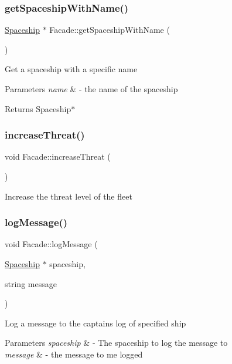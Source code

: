 \subsubsection{\texorpdfstring{get\+Spaceship\+With\+Name()}{getSpaceshipWithName()}}
{\footnotesize\ttfamily \hyperlink{classSpaceship}{Spaceship} $\ast$ Facade\+::get\+Spaceship\+With\+Name (\begin{DoxyParamCaption}{ }\end{DoxyParamCaption})}

Get a spaceship with a specific name 
\begin{DoxyParams}{Parameters}
{\em name} & -\/ the name of the spaceship \\
\hline
\end{DoxyParams}
\begin{DoxyReturn}{Returns}
Spaceship$\ast$ 
\end{DoxyReturn}
\mbox{\label{classFacade_ab7da0040c4f6f61a0bbff3cb0d4114ea}} 
\subsubsection{\texorpdfstring{increase\+Threat()}{increaseThreat()}}
{\footnotesize\ttfamily void Facade\+::increase\+Threat (\begin{DoxyParamCaption}{ }\end{DoxyParamCaption})}

Increase the threat level of the fleet \mbox{\label{classFacade_a71538ab2a843ef79bc998fb494b78591}} 
\subsubsection{\texorpdfstring{log\+Message()}{logMessage()}}
{\footnotesize\ttfamily void Facade\+::log\+Message (\begin{DoxyParamCaption}\item[{\hyperlink{classSpaceship}{Spaceship} $\ast$}]{spaceship,  }\item[{string}]{message }\end{DoxyParamCaption})}

Log a message to the captains log of specified ship 
\begin{DoxyParams}{Parameters}
{\em spaceship} & -\/ The spaceship to log the message to \\
\hline
{\em message} & -\/ the message to me logged \\
\hline
\end{DoxyParams}
\mbox{\label{classFacade_a5519cbabe4e10ae5b904f9726133548b}} 
